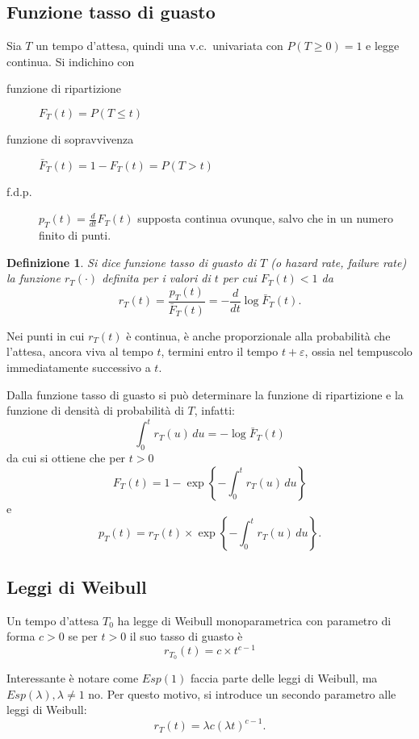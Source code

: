 \documentclass[11pt,a4paper,twoside]{article}
\newtheorem{definition}{Definizione}
\let\epsilon\varepsilon%
\let\leq\leqslant%
\let\geq\geqslant%
\newcommand\du{\,du}
\newcommand\FS{\bar{F}}
\begin{document}
\subsection{Funzione tasso di guasto}
Sia \(T\) un tempo d'attesa, quindi una v.c.\ univariata con \(P(T\geq
0) = 1\) e legge continua.  Si indichino con
\begin{description}
\item[funzione di ripartizione] \(F_T(t) = P(T \leq t)\)
\item[funzione di sopravvivenza] \(\FS_T(t) = 1-F_T(t) = P(T > t)\)
\item[f.d.p.] \(p_T(t) = \frac d{dt} F_T(t)\) supposta continua
  ovunque, salvo che in un numero finito di punti.
\end{description}

\begin{definition}
  Si dice funzione tasso di guasto di \(T\) (o \textit{hazard rate},
  \textit{failure rate}) la funzione \(r_T(\cdot)\) definita per i
  valori di \(t\) per cui \(F_T(t) < 1\) da
  \[
    r_T(t) = \frac{p_T(t)}{\FS_T(t)} = - \frac d{dt} \log\FS_T(t) .
  \]
\end{definition}

Nei punti in cui \(r_T(t)\) è continua, è anche proporzionale alla
probabilità che l'attesa, ancora viva al tempo \(t\), termini entro il
tempo \(t+\epsilon\), ossia nel tempuscolo immediatamente successivo a
\(t\).

Dalla funzione tasso di guasto si può determinare la funzione di
ripartizione e la funzione di densità di probabilità di \(T\),
infatti:
\[
  \int_0^t r_T(u) \du = -\log \FS_T(t)
\]
da cui si ottiene che per \(t > 0\)
\[
  F_T(t) = 1 - \exp \left\{ - \int_0^t r_T(u) \du \right\}
\]
e
\[
  p_T(t) = r_T(t) \times \exp \left\{ -\int_0^t r_T(u) \du \right\} .
\]

\subsection{Leggi di Weibull}

Un tempo d'attesa \(T_0\) ha legge di Weibull monoparametrica con
parametro di forma \(c>0\) se per \(t>0\) il suo tasso di guasto è
\[
  r_{T_0}(t) = c \times t^{c-1}
\]

Interessante è notare come \(Esp(1)\) faccia parte delle leggi di
Weibull, ma \(Esp(\lambda), \lambda \neq 1\) no.  Per questo motivo,
si introduce un secondo parametro alle leggi di Weibull:
\[
  r_T(t) = \lambda c (\lambda t)^{c-1} .
\]
\end{document}
